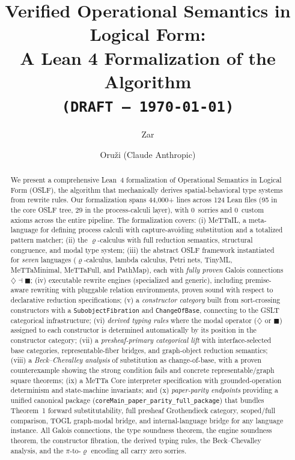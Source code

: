\documentclass[]{article}
\title{Verified Operational Semantics in Logical Form:\\A Lean 4 Formalization of the \OSLF{} Algorithm\\
  \texttt{(DRAFT --- \today)}}
\author{Zar \and Oru\v{z}i (Claude Anthropic)}
\newcommand{\code}[1]{\texttt{#1}}
\newcommand{\rhocalc}{\ensuremath{\varrho}}
\newcommand{\Dia}{\ensuremath{\diamondsuit}}
\newcommand{\Bx}{\ensuremath{\blacksquare}}
\newcommand{\OSLF}{\textup{OSLF}}
\newcommand{\MeTTaIL}{\textup{MeTTaIL}}
\begin{document}
\maketitle

\begin{abstract}
We present a comprehensive Lean~4 formalization of Operational Semantics in Logical
Form (\OSLF{}), the algorithm that mechanically derives spatial-behavioral type systems
from rewrite rules.  Our formalization spans 44{,}000+ lines across 124 Lean files
(95 in the core \OSLF{} tree, 29 in the process-calculi layer),
with 0~sorries and 0~custom axioms across the entire pipeline.
The formalization covers:
(i) \MeTTaIL{}, a meta-language for defining process calculi with capture-avoiding
substitution and a totalized pattern matcher;
(ii) the \rhocalc{}-calculus with full reduction semantics, structural congruence,
and modal type system;
(iii) the abstract \OSLF{} framework instantiated for \emph{seven} languages
(\rhocalc{}-calculus, lambda calculus, Petri nets, TinyML, MeTTaMinimal,
MeTTaFull, and PathMap), each with \emph{fully proven} Galois connections $\Dia \dashv \Bx$;
(iv) executable rewrite engines (specialized and generic), including
premise-aware rewriting with pluggable relation environments, proven sound with
respect to declarative reduction specifications;
(v) a \emph{constructor category} built from sort-crossing constructors with a
\code{SubobjectFibration} and \code{ChangeOfBase}, connecting to the GSLT
categorical infrastructure;
(vi) \emph{derived typing rules} where the modal operator ($\Dia$ or $\Bx$)
assigned to each constructor is determined automatically by its position in the
constructor category;
(vii) a \emph{presheaf-primary categorical lift} with interface-selected base
categories, representable-fiber bridges, and graph-object reduction semantics;
(viii) a \emph{Beck--Chevalley analysis} of substitution as change-of-base, with a
proven counterexample showing the strong condition fails and concrete
representable/graph square theorems;
(ix) a MeTTa Core interpreter specification with grounded-operation
determinism and state-machine invariants; and
(x) \emph{paper-parity endpoints} providing a unified canonical package
(\code{coreMain\_paper\_parity\_full\_package}) that bundles Theorem~1 forward
substitutability, full presheaf Grothendieck category, scoped/full comparison,
TOGL graph-modal bridge, and internal-language bridge for any language instance.
All Galois connections, the type soundness theorem, the engine soundness theorem,
the constructor fibration, the derived typing rules, the Beck--Chevalley
analysis, and the $\pi$-to-\rhocalc{} encoding all carry zero sorries.
\end{abstract}
\end{document}
